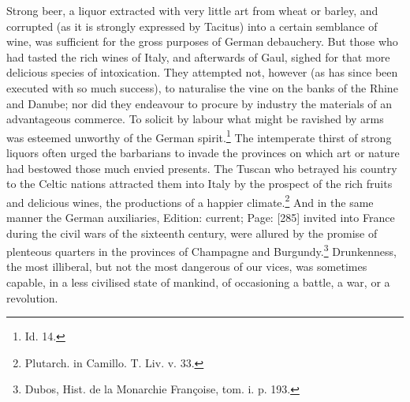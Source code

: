 Strong beer, a liquor extracted with very little art from wheat or barley, and corrupted (as it is strongly expressed by Tacitus) into a certain semblance of wine, was sufficient for the gross purposes of German debauchery. But those who had tasted the rich wines of Italy, and afterwards of Gaul, sighed for that more delicious species of intoxication. They attempted not, however (as has since been executed with so much success), to naturalise the vine on the banks of the Rhine and Danube; nor did they endeavour to procure by industry the materials of an advantageous commerce. To solicit by labour what might be ravished by arms was esteemed unworthy of the German spirit.\footnote{Id. 14.} The intemperate thirst of strong liquors often urged the barbarians to invade the provinces on which art or nature had bestowed those much envied presents. The Tuscan who betrayed his country to the Celtic nations attracted them into Italy by the prospect of the rich fruits and delicious wines, the productions of a happier climate.\footnote{Plutarch. in Camillo. T. Liv. v. 33.} And in the same manner the German auxiliaries, Edition: current; Page: [285] invited into France during the civil wars of the sixteenth century, were allured by the promise of plenteous quarters in the provinces of Champagne and Burgundy.\footnote{Dubos, Hist. de la Monarchie Françoise, tom. i. p. 193.} Drunkenness, the most illiberal, but not the most dangerous of our vices, was sometimes capable, in a less civilised state of mankind, of occasioning a battle, a war, or a revolution.

